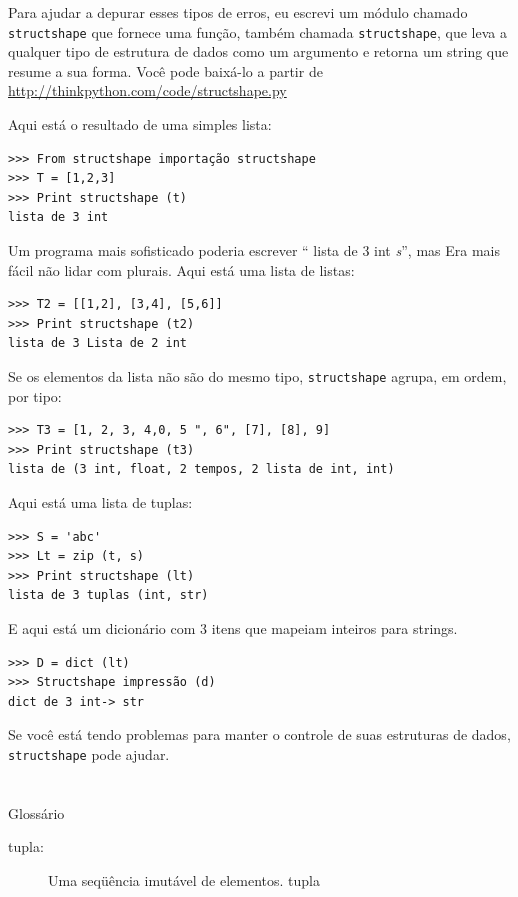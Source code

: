 \documentclass[10pt]{book}
\begin{document}
\begin{v erbatim}
Para ajudar a depurar esses tipos de erros, eu escrevi um módulo
chamado {\tt structshape} que fornece uma função, também chamada
{\tt structshape}, que leva a qualquer tipo de estrutura de dados como
um argumento e retorna um string que resume a sua forma.
Você pode baixá-lo a partir de \url{http://thinkpython.com/code/structshape.py}

Aqui está o resultado de uma simples lista:

\begin{verbatim}
>>> From structshape importação structshape
>>> T = [1,2,3]
>>> Print structshape (t)
lista de 3 int
\end{verbatim}
%
Um programa mais sofisticado poderia escrever `` lista de 3 int {\em s}'', mas
Era mais fácil não lidar com plurais. Aqui está uma lista de listas:

\begin{verbatim}
>>> T2 = [[1,2], [3,4], [5,6]]
>>> Print structshape (t2)
lista de 3 Lista de 2 int
\end{verbatim}
%
Se os elementos da lista não são do mesmo tipo,
{\tt structshape} agrupa, em ordem, por tipo:

\begin{verbatim}
>>> T3 = [1, 2, 3, 4,0, 5 ", 6", [7], [8], 9]
>>> Print structshape (t3)
lista de (3 int, float, 2 tempos, 2 lista de int, int)
\end{verbatim}
%
Aqui está uma lista de tuplas:

\begin{verbatim}
>>> S = 'abc'
>>> Lt = zip (t, s)
>>> Print structshape (lt)
lista de 3 tuplas (int, str)
\end{verbatim}
%
E aqui está um dicionário com 3 itens que mapeiam inteiros para strings.

\begin{verbatim}
>>> D = dict (lt) 
>>> Structshape impressão (d)
dict de 3 int-> str
\end{verbatim}
%
Se você está tendo problemas para manter o controle de suas estruturas de dados,
{\tt structshape} pode ajudar.


\section{} Glossário

\begin{description}

\item[tupla:] Uma seqüência imutável de elementos.
\index{} tupla


\end{description}
\end{v erbatim}
\end{document}
